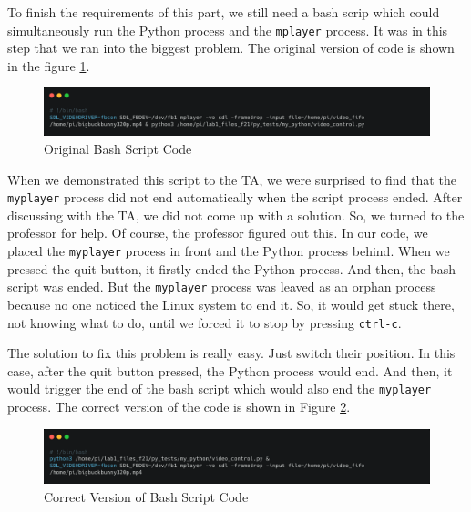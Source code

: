 \documentclass[12pt]{report}
\newcommand{\code}[1]{\colorbox{light-gray}{\texttt{#1}}}
\begin{document}
To finish the requirements of this part, we still need a bash scrip which could simultaneously run the Python process and the \code{mplayer} process. It was in this step that we ran into the biggest problem. The original version of code is shown in the figure \ref{fig:fig8}.
\begin{figure}[H]
    \includegraphics[width=\textwidth]{img/Figure8.png}
    \centering
    \caption{Original Bash Script Code}
    \label{fig:fig8}
\end{figure}
When we demonstrated this script to the TA, we were surprised to find that the \code{myplayer} process did not end automatically when the script process ended. After discussing with the TA, we did not come up with a solution. So, we turned to the professor for help. Of course, the professor figured out this. In our code, we placed the \code{myplayer} process in front and the Python process behind. When we pressed the quit button, it firstly ended the Python process. And then, the bash script was ended. But the \code{myplayer} process was leaved as an orphan process because no one noticed the Linux system to end it. So, it would get stuck there, not knowing what to do, until we forced it to stop by pressing \code{ctrl-c}.\par
The solution to fix this problem is really easy. Just switch their position. In this case, after the quit button pressed, the Python process would end. And then, it would trigger the end of the bash script which would also end the \code{myplayer} process. The correct version of the code is shown in Figure \ref{fig:fig9}.\par
\begin{figure}[H]
    \includegraphics[width=\textwidth]{img/Figure9.png}
    \centering
    \caption{Correct Version of Bash Script Code}
    \label{fig:fig9}
\end{figure}
\newpage
\end{document}
